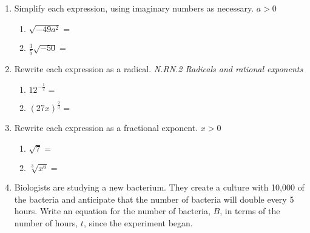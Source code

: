 \documentclass[12pt, twoside]{article}
\begin{document}
\begin{enumerate}[itemsep=0.5cm]
\item Simplify each expression, using imaginary numbers as necessary. $a > 0$
    \begin{multicols}{2}
    \begin{enumerate}[itemsep=0.5cm]
        \item $\sqrt{-49a^2}=$
        \item $\displaystyle \frac{3}{5} \sqrt{-50}=$
    \end{enumerate}
    \end{multicols} \vspace{1cm}
  
\item Rewrite each expression as a radical. \hfill \emph{N.RN.2 Radicals and rational exponents} \vspace{0.25cm}
    \begin{multicols}{2}
      \begin{enumerate}[itemsep=1cm]
        \item $\displaystyle 12^{-\frac{1}{2}}=$
        \item $\displaystyle (27x)^{\frac{2}{3}}=$
      \end{enumerate}
      \end{multicols} \vspace{1cm}
      
\item Rewrite each expression as a fractional exponent. $x>0$  \vspace{0.25cm}
    \begin{multicols}{2}
      \begin{enumerate}[itemsep=1cm]
          \item $\sqrt{7} =$
          \item $\sqrt[3]{x^6} =$
      \end{enumerate}
      \end{multicols}

\newpage
\item Biologists are studying a new bacterium. They create a culture with 10,000 of the bacteria and anticipate that the number of bacteria will double every 5 hours. Write an equation for the number of bacteria, $B$, in terms of the number of hours, $t$, since the experiment began. %
    \vspace{2cm}


\end{enumerate}
\end{document}
